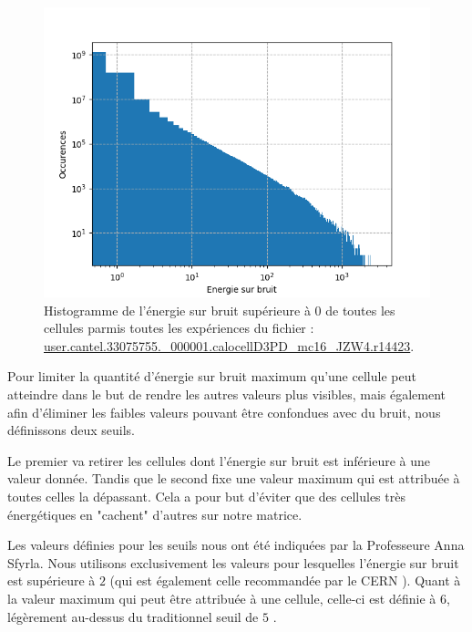 \begin{figure}[hbt!]
    \centering
    \includegraphics[scale=0.7]{Figures/dataset/hist_energy_over_sigma.png}
    \caption{Histogramme de l'énergie sur bruit supérieure à 0 de toutes les cellules parmis toutes les expériences du fichier : \url{user.cantel.33075755.\_000001.calocellD3PD\_mc16\_JZW4.r14423}.}
    \label{fig:hist_energy_over_sigma}
\end{figure}

\break

Pour limiter la quantité d'énergie sur bruit maximum qu'une cellule peut atteindre dans le but de rendre les autres valeurs plus visibles, mais également afin d'éliminer les faibles valeurs pouvant être confondues avec du bruit, nous définissons deux seuils.

Le premier va retirer les cellules dont l'énergie sur bruit est inférieure à une valeur donnée. Tandis que le second fixe une valeur maximum qui est attribuée à toutes celles la dépassant. Cela a pour but d'éviter que des cellules très énergétiques en "cachent" d'autres sur notre matrice.

Les valeurs définies pour les seuils nous ont été indiquées par la Professeure Anna Sfyrla. Nous utilisons exclusivement les valeurs pour lesquelles l'énergie sur bruit est supérieure à $2$ (qui est également celle recommandée par le CERN \cite{gross_frequentist_2011}). Quant à la valeur maximum qui peut être attribuée à une cellule, celle-ci est définie à $6$, légèrement au-dessus du traditionnel seuil de $5$ \cite{lyons_discovering_2013}.\\

